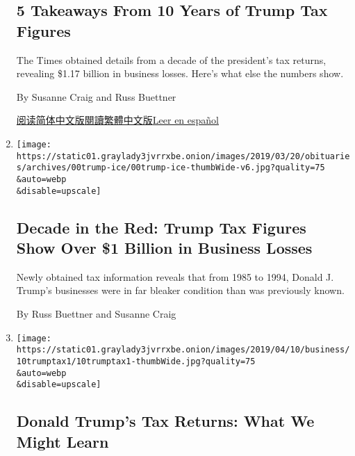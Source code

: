 \begin{enumerate}
  \hypertarget{5-takeaways-from-10-years-of-trump-tax-figures}{%
  \subsection{5 Takeaways From 10 Years of Trump Tax
  Figures}\label{5-takeaways-from-10-years-of-trump-tax-figures}}

  The Times obtained details from a decade of the president's tax
  returns, revealing \$1.17 billion in business losses. Here's what else
  the numbers show.

  By Susanne Craig and Russ Buettner

  \href{https://cn.nytimes3xbfgragh.onion/usa/20190508/trump-tax-figures/}{阅读简体中文版}\href{https://cn.nytimes3xbfgragh.onion/usa/20190508/trump-tax-figures/zh-hant/}{閱讀繁體中文版}\href{https://www.nytimes3xbfgragh.onion/es/2019/05/08/trump-declaraciones-impuestos/}{Leer
  en español}
\item
  \href{/interactive/2019/05/07/us/politics/donald-trump-taxes.html}{}

  \texttt{[image: https://static01.graylady3jvrrxbe.onion/images/2019/03/20/obituaries/archives/00trump-ice/00trump-ice-thumbWide-v6.jpg?quality=75\\\&auto=webp\\\&disable=upscale]}

  \hypertarget{decade-in-the-red-trump-tax-figures-show-over-1-billion-in-business-losses}{%
  \subsection{Decade in the Red: Trump Tax Figures Show Over \$1 Billion
  in Business
  Losses}\label{decade-in-the-red-trump-tax-figures-show-over-1-billion-in-business-losses}}

  Newly obtained tax information reveals that from 1985 to 1994, Donald
  J. Trump's businesses were in far bleaker condition than was
  previously known.

  By Russ Buettner and Susanne Craig
\item
  \href{/2019/04/10/business/trump-tax-returns.html}{}

  \texttt{[image: https://static01.graylady3jvrrxbe.onion/images/2019/04/10/business/10trumptax1/10trumptax1-thumbWide.jpg?quality=75\\\&auto=webp\\\&disable=upscale]}

  \hypertarget{donald-trumps-tax-returns-what-we-might-learn}{%
  \subsection{Donald Trump's Tax Returns: What We Might
  Learn}\label{donald-trumps-tax-returns-what-we-might-learn}}


\end{enumerate}
